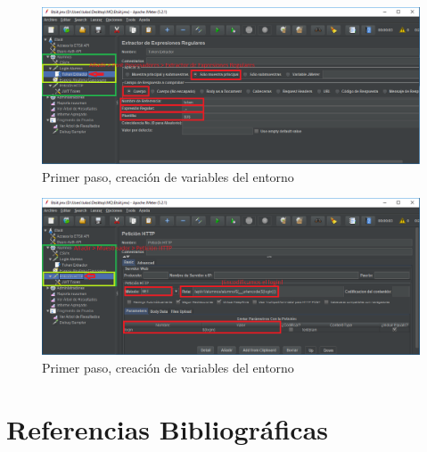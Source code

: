 \documentclass[12pt,a4paper]{article}
\begin{document}
	\begin{figure}[h]
		\centering
		\includegraphics[width=1.0\textwidth]{images/step-7.png}
		\caption{Primer paso, creación de variables del entorno}
	\end{figure}

	\begin{figure}[h]
		\centering
		\includegraphics[width=1.0\textwidth]{images/step-8.png}
		\caption{Primer paso, creación de variables del entorno}
	\end{figure}
	\newpage
	\section{Referencias Bibliográficas}
	\begin{thebibliography}{9}
		
		
	\end{thebibliography}
		
\end{document}
